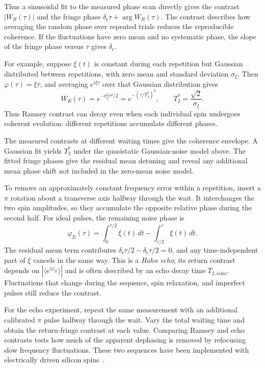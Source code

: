 Thus a sinusoidal fit to the measured phase scan directly gives
the contrast $|W_R(\tau)|$ and the fringe phase
$\delta_{\mathrm r}\tau+\arg W_R(\tau)$. The contrast describes
how averaging the random phase over repeated trials reduces the
reproducible coherence. If the fluctuations have zero mean and no
systematic phase, the slope of the fringe phase versus $\tau$ gives
$\delta_{\mathrm r}$.

For example, suppose $\xi(t)$ is constant during each
repetition but Gaussian distributed between repetitions, with
zero mean and standard deviation $\sigma_\xi$. Then
$\varphi(\tau)=\xi\tau$, and averaging
$e^{i\xi\tau}$ over that Gaussian distribution gives
\begin{equation}
 W_R(\tau)=e^{-\sigma_\xi^2\tau^2/2}
           =e^{-(\tau/T_2^*)^2},\qquad
 T_2^*=\frac{\sqrt2}{\sigma_\xi}.
 \label{eq:measurement-quasistatic-dephasing}
\end{equation}
Thus Ramsey contrast can decay even when each individual spin
undergoes coherent evolution: different repetitions accumulate
different phases.

The measured contrasts at different waiting times give the
coherence envelope. A Gaussian fit yields $T_2^*$ under the
quasistatic Gaussian-noise model above. The fitted fringe phases
give the residual mean detuning and reveal any additional mean
phase shift not included in the zero-mean noise model.

To remove an approximately constant frequency error within a
repetition, insert a $\pi$ rotation about a transverse axis halfway
through the wait. It interchanges the two spin amplitudes, so they
accumulate the opposite relative phase during the second half.
For ideal pulses, the remaining noise phase is
\begin{equation}
 \varphi_E(\tau)=\int_0^{\tau/2}\xi(t)\,dt
                   -\int_{\tau/2}^{\tau}\xi(t)\,dt.
 \label{eq:measurement-echo-phase}
\end{equation}
The residual mean term contributes
$\delta_{\mathrm r}\tau/2-\delta_{\mathrm r}\tau/2=0$, and any
time-independent part of $\xi$ cancels in the same way.
This is a \emph{Hahn echo}; its return
contrast depends on $|\langle e^{i\varphi_E}\rangle|$ and is often
described by an echo decay time $T_{2,\mathrm{echo}}$. Fluctuations
that change during the sequence, spin relaxation, and imperfect
pulses still reduce the contrast.

For the echo experiment, repeat the same measurement with an
additional calibrated $\pi$ pulse halfway through the wait.
Vary the total waiting time and obtain the return-fringe contrast
at each value. Comparing Ramsey and echo contrasts tests how much
of the apparent dephasing is removed by refocusing slow frequency
fluctuations. These two sequences have been implemented with
electrically driven silicon spins~\cite{Kawakami2014}.

